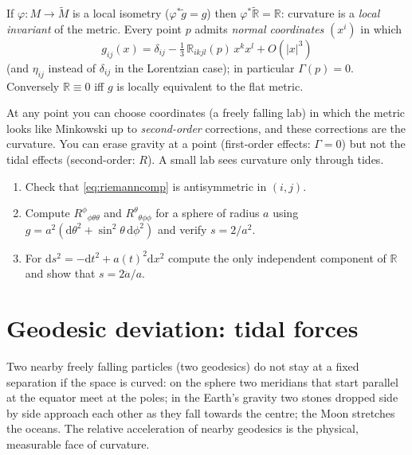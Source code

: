 \documentclass[11pt,a4paper]{article}
\numberwithin{equation}{section}
\theoremstyle{definition}
\theoremstyle{plain}
\newcommand{\dd}{\mathrm{d}}
\begin{document}
\begin{formal}
If $\varphi:M\to\tilde M$ is a local isometry ($\varphi^*\tilde g=g$) then $\varphi^*\tilde{\mathbb R}=\mathbb R$: curvature is a \emph{local invariant} of the metric. Every point $p$ admits \emph{normal coordinates} $(x^i)$ in which
\[
g_{ij}(x)=\delta_{ij}-\tfrac13\,\mathbb R_{ikjl}(p)\,x^kx^l+O(|x|^3)
\]
(and $\eta_{ij}$ instead of $\delta_{ij}$ in the Lorentzian case); in particular $\Gamma(p)=0$. Conversely $\mathbb R\equiv0$ iff $g$ is locally equivalent to the flat metric.
\end{formal}
\begin{intuition}
At any point you can choose coordinates (a freely falling lab) in which the metric looks like Minkowski up to \emph{second-order} corrections, and these corrections are the curvature. You can erase gravity at a point (first-order effects: $\Gamma=0$) but not the tidal effects (second-order: $R$). A small lab sees curvature only through tides.
\end{intuition}

\begin{exercises}
\begin{enumerate}[nosep]
\item Check that \eqref{eq:riemanncomp} is antisymmetric in $(i,j)$.
\item Compute $R^\phi{}_{\phi\theta\theta}$ and $R^\theta{}_{\theta\phi\phi}$ for a sphere of radius $a$ using $g=a^2(\dd\theta^2+\sin^2\theta\,\dd\phi^2)$ and verify $s=2/a^2$.
\item For $\dd s^2=-\dd t^2+a(t)^2\dd x^2$ compute the only independent component of $\mathbb R$ and show that $s=2\ddot a/a$.
\end{enumerate}
\end{exercises}


\section{Geodesic deviation: tidal forces}\label{sec:deviation}

\begin{intuition}
Two nearby freely falling particles (two geodesics) do not stay at a fixed separation if the space is curved: on the sphere two meridians that start parallel at the equator meet at the poles; in the Earth's gravity two stones dropped side by side approach each other as they fall towards the centre; the Moon stretches the oceans. The relative acceleration of nearby geodesics is the physical, measurable face of curvature.
\end{intuition}
\end{document}
